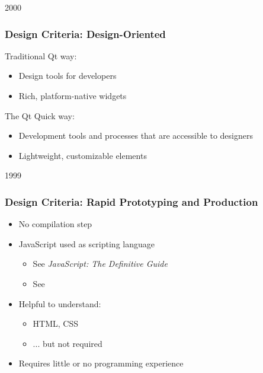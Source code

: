
\begin{slide}{2000}\frametitle{Design Criteria: Design-Oriented}


Traditional Qt way:
\begin{itemize}
\item Design tools for developers
\item Rich, platform-native widgets
\end{itemize}


The Qt Quick way:
\begin{itemize}
\item Development tools and processes that are accessible to designers
\item Lightweight, customizable elements
\end{itemize}

\end{slide}


\begin{slide}{1999}\frametitle{Design Criteria: Rapid Prototyping and Production}

\begin{itemize}
    \item No compilation step
    \item JavaScript used as scripting language
    \begin{itemize}
       \item See \emph{JavaScript: The Definitive Guide} 
       \item See 
    \end{itemize}
    \item Helpful to understand:
    \begin{itemize}
       \item HTML, CSS 
       \item ... but not required  
    \end{itemize} 
    \item Requires little or no programming experience
\end{itemize}


\end{slide}

